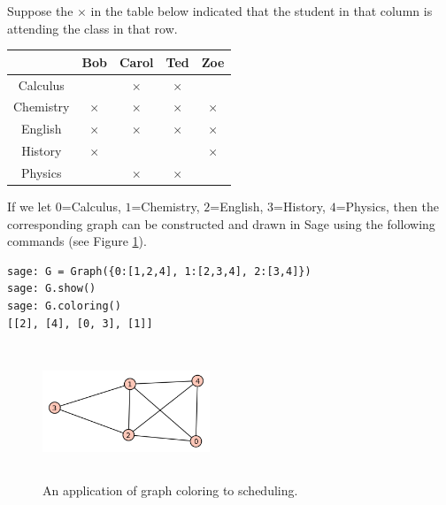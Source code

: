 \begin{example} 
\label{example:coloring}
Suppose the $\times$ in the table below
indicated that the student in that column is attending the class in that
row.

\begin{center}
\begin{tabular}{c|cccc}
                  &  Bob            &  Carol         &       Ted      &    Zoe   \\ \hline
Calculus          &                 &    $\times$   &  $\times$      &           \\
Chemistry        &    $\times$     &   $\times$   &    $\times$   &    $\times$   \\
English            &    $\times$     &   $\times$   &    $\times$   &    $\times$   \\
History          &    $\times$     &              &             &    $\times$     \\
Physics          &                    &    $\times$  &    $\times$    &    \\  \hline

\end{tabular}
\end{center}

If we let $0$=Calculus, $1$=Chemistry, $2$=English,
$3$=History, $4$=Physics, then the corresponding graph can be
constructed and drawn in Sage using the following commands
(see Figure \ref{fig:graph-coloring-scheduling}).

\begin{lstlisting}
sage: G = Graph({0:[1,2,4], 1:[2,3,4], 2:[3,4]})
sage: G.show()
sage: G.coloring()
[[2], [4], [0, 3], [1]]
\end{lstlisting}


\begin{figure}[h!]
\begin{center}
\includegraphics[height=4cm,width=5cm]{image/graph-coloring/graph-coloring-scheduling}
\end{center}
\caption{An application of graph coloring to scheduling.}
\label{fig:graph-coloring-scheduling}
\end{figure}
\end{example}


